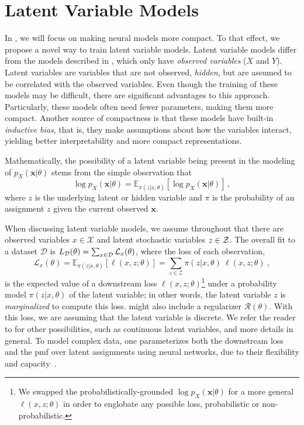 \section{Latent Variable Models}
\label{sec:lvm}

\noindent In , we will focus on making
neural models more compact. To that effect, we propose a novel way to
train latent variable models. Latent variable models differ from the
models described in , which only have
\textit{observed variables} ($X$ and $Y$). Latent variables are
variables that are not observed, \ie \textit{hidden}, but are assumed
to be correlated with the observed variables. Even though the
training of these models may be difficult, there are significant
advantages to this approach. Particularly, these models often need
fewer parameters, making them more compact. Another source of
compactness is that these models have built-in \textit{inductive
    bias}, that is, they make assumptions about how the variables
interact, yielding better interpretability and more compact
representations.

Mathematically, the possibility of a latent variable being present
in the modeling of $p_X(\bm{x}|\theta)$ stems from the simple
observation that
%
\begin{equation}\label{eq:lvm}
    \log p_X(\bm{x}|\theta) =
    \mathbb{E}_{\pi(z | x, \theta)} \left[\log p_X(\bm{x}|\theta)\right]\,,
\end{equation}
%
where $z$ is the underlying latent or hidden variable and $\pi$ is the
probability of an assignment $z$ given the current observed $\bm{x}$.

When discussing latent variable models, we assume throughout that there are observed variables
$x \in \mathcal{X}$ and latent stochastic variables $z \in \mathcal{Z}$. The
overall fit to a dataset $\mathcal D$ is $L_\mathcal{D}(\theta) =
    \sum_{x \in \mathcal{D}} \mathcal{L}_x(\theta)$, where the loss of each
observation,
%
\begin{equation}\label{eq:fit}
    \mathcal{L}_{x}(\theta) =
    \mathbb E_{\pi(z|x, \theta)}
    \left[ \ell(x, z; \theta)\right] =
    \sum_{z \in \mathcal Z} \pi(z | x, \theta)~\ell(x, z; \theta) ~,
\end{equation}
%
is the expected value of a downstream loss $\ell(x,z;\theta)$\footnote{
    We swapped the probabilistically-grounded $\log p_X(\bm{x}|\theta)$
    for a more general $\ell(x,z;\theta)$ in order
    to englobate any possible loss, probabilistic or non-probabilistic.
}
under a
probability model $\pi(z|x,\theta)$ of the latent variable; in other
words, the latent variable $z$ is {\it marginalized} to compute this loss.
 might also include a regularizer $\mathcal{R}(\theta)$.
With this loss, we are assuming that the latent variable is discrete. We refer the reader
to \citet{Kim2018} for other possibilities, such as continuous latent variables, and more
details in general.
To model complex data, one parameterizes both the downstream loss and
the pmf over latent assignments using neural networks, due
to their flexibility and capacity~\citep{Kingma+2014:VAE}.

